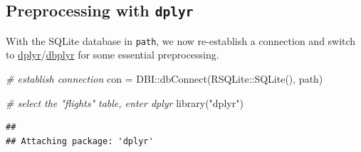 \documentclass[
]{scrbook}
\newenvironment{Shaded}{\begin{snugshade}}{\end{snugshade}}
\newcommand{\AttributeTok}[1]{\textcolor[rgb]{0.77,0.63,0.00}{#1}}
\newcommand{\CommentTok}[1]{\textcolor[rgb]{0.56,0.35,0.01}{\textit{#1}}}
\newcommand{\DecValTok}[1]{\textcolor[rgb]{0.00,0.00,0.81}{#1}}
\newcommand{\FunctionTok}[1]{\textcolor[rgb]{0.00,0.00,0.00}{#1}}
\newcommand{\NormalTok}[1]{#1}
\newcommand{\OtherTok}[1]{\textcolor[rgb]{0.56,0.35,0.01}{#1}}
\newcommand{\SpecialCharTok}[1]{\textcolor[rgb]{0.00,0.00,0.00}{#1}}
\newcommand{\StringTok}[1]{\textcolor[rgb]{0.31,0.60,0.02}{#1}}
\renewenvironment{Shaded} {\begin{snugshade}\small} {\end{snugshade}}
\begin{document}
\begin{Shaded}
\end{Shaded}

\hypertarget{preprocessing-with-dplyr}{%
\subsection{\texorpdfstring{Preprocessing with \texttt{dplyr}}{Preprocessing with dplyr}}\label{preprocessing-with-dplyr}}

With the SQLite database in \texttt{path}, we now re-establish a connection and switch to \href{https://cran.r-project.org/package=dplyr}{dplyr}/\href{https://cran.r-project.org/package=dbplyr}{dbplyr} for some essential preprocessing.

\begin{Shaded}
\begin{Highlighting}[]
\CommentTok{\# establish connection}
\NormalTok{con }\OtherTok{=}\NormalTok{ DBI}\SpecialCharTok{::}\FunctionTok{dbConnect}\NormalTok{(RSQLite}\SpecialCharTok{::}\FunctionTok{SQLite}\NormalTok{(), path)}

\CommentTok{\# select the "flights" table, enter dplyr}
\FunctionTok{library}\NormalTok{(}\StringTok{"dplyr"}\NormalTok{)}
\end{Highlighting}
\end{Shaded}

\begin{verbatim}
## 
## Attaching package: 'dplyr'
\end{verbatim}
\end{document}
